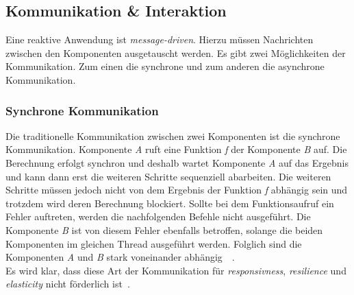 \pagebreak

\subsection{Kommunikation \& Interaktion}\label{subsec:communication}
Eine reaktive Anwendung ist \textit{message-driven}. Hierzu müssen Nachrichten zwischen den Komponenten ausgetauscht werden. Es gibt zwei Möglichkeiten der Kommunikation. Zum einen die synchrone und zum anderen die asynchrone Kommunikation.

\subsubsection{Synchrone Kommunikation}
Die traditionelle Kommunikation zwischen zwei Komponenten ist die synchrone Kommunikation. Komponente \textit{A} ruft eine Funktion \textit{f} der Komponente \textit{B} auf. Die Berechnung erfolgt synchron und deshalb wartet Komponente \textit{A} auf das Ergebnis und kann dann erst die weiteren Schritte sequenziell abarbeiten. Die weiteren Schritte müssen jedoch nicht von dem Ergebnis der Funktion \textit{f} abhängig sein und trotzdem wird deren Berechnung blockiert. Sollte bei dem Funktionsaufruf ein Fehler auftreten, werden die nachfolgenden Befehle nicht ausgeführt. Die Komponente \textit{B} ist von diesem Fehler ebenfalls betroffen, solange die beiden Komponenten im gleichen Thread ausgeführt werden. Folglich sind die Komponenten \textit{A} und \textit{B} stark voneinander abhängig~\cite[S.~22]{kuhn_reactive_2015}~\cite{jackson_how_2016}.\\
Es wird klar, dass diese Art der Kommunikation für \textit{responsivness}, \textit{resilience} und \textit{elasticity} nicht förderlich ist~\cite[S.~46]{kuhn_reactive_2015}.


